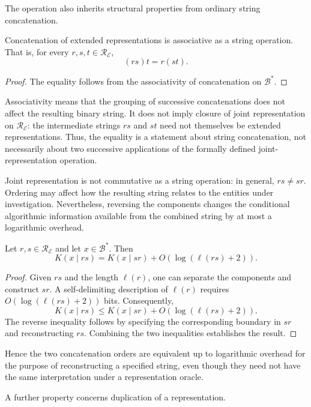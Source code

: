 The operation also inherits structural properties from ordinary string concatenation.

\begin{proposition}
Concatenation of extended representations is associative as a string operation. That is, for every $r,s,t\in\mathcal{R}_{\mathcal{E}}$,
\[
(rs)t=r(st).
\]
\end{proposition}
\begin{proof}
The equality follows from the associativity of concatenation on $\mathcal{B}^\ast$.
\end{proof}

Associativity means that the grouping of successive concatenations does not affect the resulting binary string. It does not imply closure of joint representation on $\mathcal{R}_{\mathcal{E}}$: the intermediate strings $rs$ and $st$ need not themselves be extended representations. Thus, the equality is a statement about string concatenation, not necessarily about two successive applications of the formally defined joint-representation operation.

Joint representation is not commutative as a string operation: in general, $rs\neq sr$. Ordering may affect how the resulting string relates to the entities under investigation. Nevertheless, reversing the components changes the conditional algorithmic information available from the combined string by at most a logarithmic overhead.

\begin{proposition}
Let $r,s\in\mathcal{R}_{\mathcal{E}}$ and let $x\in\mathcal{B}^\ast$. Then
\[
K(x\mid rs)=K(x\mid sr)+O(\log(\ell(rs)+2)).
\]
\end{proposition}
\begin{proof}
Given $rs$ and the length $\ell(r)$, one can separate the components and construct $sr$. A self-delimiting description of $\ell(r)$ requires $O(\log(\ell(rs)+2))$ bits. Consequently,
\[
K(x\mid rs)\leq K(x\mid sr)+O(\log(\ell(rs)+2)).
\]
The reverse inequality follows by specifying the corresponding boundary in $sr$ and reconstructing $rs$. Combining the two inequalities establishes the result.
\end{proof}

Hence the two concatenation orders are equivalent up to logarithmic overhead for the purpose of reconstructing a specified string, even though they need not have the same interpretation under a representation oracle.

A further property concerns duplication of a representation.


